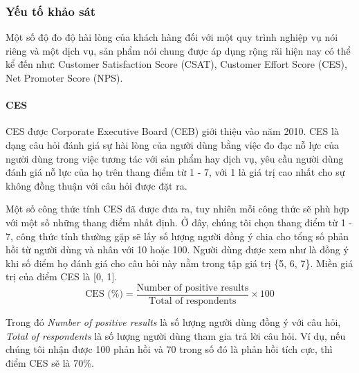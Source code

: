 \subsubsection{Yếu tố khảo sát}
Một số độ đo độ hài lòng của khách hàng đối với một quy trình nghiệp vụ nói riêng và một dịch vụ, sản phẩm nói chung được áp dụng rộng rãi hiện nay có thể kể đến như: Customer Satisfaction Score (CSAT), Customer Effort Score (CES), Net Promoter Score (NPS).

\paragraph{CES}\mbox{}

CES được Corporate Executive Board (CEB) giới thiệu vào năm 2010. CES là dạng câu hỏi đánh giá sự hài lòng của người dùng bằng việc đo đạc nỗ lực của người dùng trong việc tương tác với sản phẩm hay dịch vụ, yêu cầu người dùng đánh giá nỗ lực của họ trên thang điểm từ 1 - 7, với 1 là giá trị cao nhất cho sự không đồng thuận với câu hỏi được đặt ra. 
\par
Một số công thức tính CES đã được đưa ra, tuy nhiên mỗi công thức sẽ phù hợp với một số những thang điểm nhất định. Ở đây, chúng tôi chọn thang điểm từ 1 - 7, công thức tính thường gặp sẽ lấy số lượng người đồng ý chia cho tổng số phản hồi từ người dùng và nhân với 10 hoặc 100. Người dùng được xem như là đồng ý khi số điểm họ đánh giá cho câu hỏi này nằm trong tập giá trị \{5, 6, 7\}. Miền giá trị của điểm CES là [0, 1].
\[ \text{CES (\%)} = \frac{\text{Number of positive results}}{\text{Total of respondents}} \times 100 \]
\par
Trong đó \emph{Number of positive results} là số lượng người dùng đồng ý với câu hỏi, \emph{Total of respondents} là số lượng người dùng tham gia trả lời câu hỏi. Ví dụ, nếu chúng tôi nhận được 100 phản hồi và 70 trong số đó là phản hồi tích cực, thì điểm CES sẽ là 70\%.

